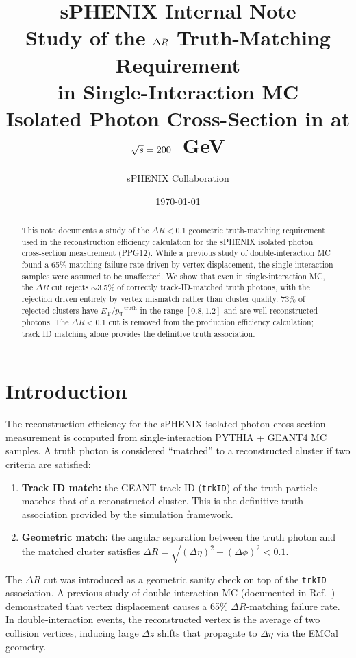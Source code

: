 \documentclass[11pt,letterpaper]{article}
\title{%
  \vspace{-1cm}
  {\large \textbf{sPHENIX Internal Note}}\\[0.5cm]
  {\LARGE \textbf{Study of the $\DR$ Truth-Matching Requirement\\
  in Single-Interaction MC}}\\[0.3cm]
  {\large Isolated Photon Cross-Section in \pp{} at $\mbox{$\sqrt{s}$} = 200$~GeV}
}
\author{sPHENIX Collaboration}
\date{\today}
\newcommand{\DR}{\ensuremath{\Delta R}}
\newcommand{\pT}{\ensuremath{p_{\text{T}}}}
\newcommand{\ET}{\ensuremath{E_{\text{T}}}}
\begin{document}
\maketitle

\begin{abstract}
This note documents a study of the $\DR < 0.1$ geometric truth-matching
requirement used in the reconstruction efficiency calculation for the sPHENIX
isolated photon cross-section measurement (PPG12). While a previous study of
double-interaction MC found a 65\% matching failure rate driven by vertex
displacement, the single-interaction samples were assumed to be unaffected.
We show that even in single-interaction MC, the $\DR$ cut rejects
$\sim$3.5\% of correctly track-ID-matched truth photons, with the rejection
driven entirely by vertex mismatch rather than cluster quality. 73\% of
rejected clusters have $\ET / \pT^{\text{truth}}$ in the range $[0.8, 1.2]$
and are well-reconstructed photons. The $\DR < 0.1$ cut is removed from the
production efficiency calculation; track ID matching alone provides the
definitive truth association.
\end{abstract}

\tableofcontents
\newpage

\section{Introduction}
\label{sec:intro}

The reconstruction efficiency for the sPHENIX isolated photon cross-section
measurement is computed from single-interaction PYTHIA + GEANT4 MC samples.
A truth photon is considered ``matched'' to a reconstructed cluster if two
criteria are satisfied:
\begin{enumerate}
  \item \textbf{Track ID match:} the GEANT track ID (\texttt{trkID}) of the
    truth particle matches that of a reconstructed cluster. This is the
    definitive truth association provided by the simulation framework.
  \item \textbf{Geometric match:} the angular separation between the truth
    photon and the matched cluster satisfies
    $\DR = \sqrt{(\Delta\eta)^2 + (\Delta\phi)^2} < 0.1$.
\end{enumerate}

The $\DR$ cut was introduced as a geometric sanity check on top of the
\texttt{trkID} association. A previous study of double-interaction MC
(documented in Ref.~\cite{di_note}) demonstrated that vertex displacement
causes a 65\% $\DR$-matching failure rate. In double-interaction events, the
reconstructed vertex is the average of two collision vertices, inducing large
$\Delta z$ shifts that propagate to $\Delta\eta$ via the EMCal geometry.
\end{document}
